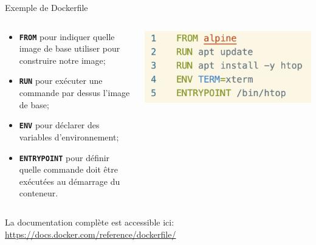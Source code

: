 \documentclass[aspectratio=169,10pt]{beamer}
\begin{document}

\begin{frame}{Exemple de Dockerfile}

\begin{columns}[T,onlytextwidth]
    \begin{column}{.5\linewidth}

    \begin{itemize}
        \item \texttt{\textbf{FROM}} pour indiquer quelle image de base utiliser pour construire notre image;
        \item \texttt{\textbf{RUN}} pour exécuter une commande par dessus l'image de base; 
        \item \texttt{\textbf{ENV}} pour déclarer des variables d'environnement;
        \item \texttt{\textbf{ENTRYPOINT}} pour définir quelle commande doit être exécutées au démarrage du conteneur.
    \end{itemize}
        
    \end{column}
    \begin{column}{.5\linewidth}
        \begin{center}
            \includegraphics[scale=0.45]{images/docker_simple.png}
        \end{center}
    \end{column}
\end{columns}

La documentation complète est accessible ici: \url{https://docs.docker.com/reference/dockerfile/}

\end{frame}

\end{document}
